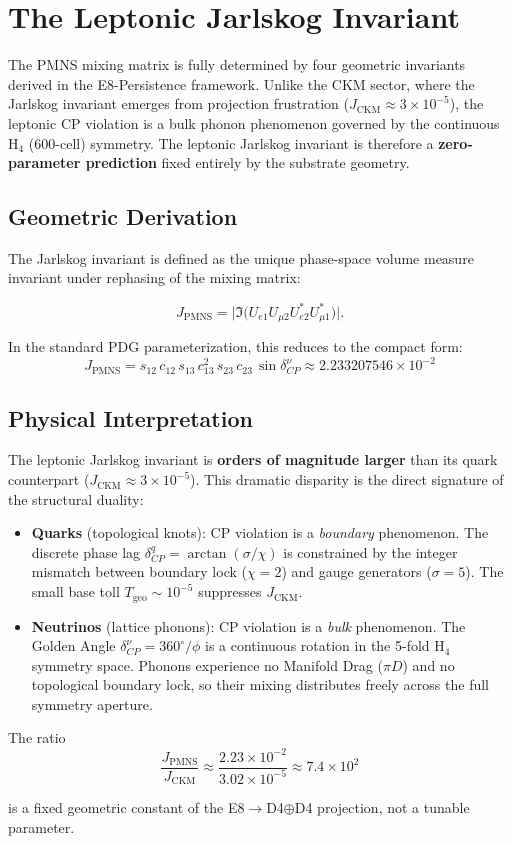 \section{The Leptonic Jarlskog Invariant}

The PMNS mixing matrix is fully determined by four geometric invariants derived in the E8-Persistence framework. Unlike the CKM sector, where the Jarlskog invariant emerges from projection frustration ($J_{\text{CKM}} \approx 3 \times 10^{-5}$),
the leptonic CP violation is a bulk phonon phenomenon governed by the continuous H$_4$ (600-cell) symmetry. The leptonic Jarlskog invariant is therefore a \textbf{zero-parameter prediction} fixed entirely by the substrate geometry.

\subsection{Geometric Derivation}

The Jarlskog invariant is defined as the unique phase-space volume measure invariant under rephasing of the mixing matrix:

\begin{equation}
    J_{\text{PMNS}} = \bigl|\Im\bigl(U_{e1} U_{\mu 2} U_{e2}^{*} U_{\mu 1}^{*}\bigr)\bigr|.
\end{equation}

In the standard PDG parameterization, this reduces to the compact form:
\begin{equation}
    \boxed{
    J_{\text{PMNS}} = s_{12}\,c_{12}\,s_{13}\,c_{13}^{2}\,s_{23}\,c_{23}\,\sin\delta_{CP}^{\nu} \approx 2.233207546 \times 10^{-2}
    }
\end{equation}

\subsection{Physical Interpretation}

The leptonic Jarlskog invariant is \textbf{orders of magnitude larger} than its quark counterpart ($J_{\text{CKM}} \approx 3 \times 10^{-5}$). This dramatic disparity is the direct signature of the structural duality:

\begin{itemize}
    \item \textbf{Quarks} (topological knots): CP violation is a \textit{boundary} phenomenon. The discrete phase lag $\delta_{CP}^{q} = \arctan(\sigma/\chi)$ is constrained by the integer mismatch between boundary lock ($\chi=2$) and
    gauge generators ($\sigma=5$). The small base toll $T_{\text{geo}} \sim 10^{-5}$ suppresses $J_{\text{CKM}}$.

    \item \textbf{Neutrinos} (lattice phonons): CP violation is a \textit{bulk} phenomenon. The Golden Angle $\delta_{CP}^{\nu} = 360^{\circ}/\phi$ is a continuous rotation in the 5-fold H$_4$ symmetry space. Phonons experience no Manifold Drag ($\pi D$) and no topological boundary lock, so their mixing distributes freely across the full symmetry aperture.
\end{itemize}

The ratio
\begin{equation}
    \frac{J_{\text{PMNS}}}{J_{\text{CKM}}} \approx \frac{2.23 \times 10^{-2}}{3.02 \times 10^{-5}}
    \approx 7.4 \times 10^{2}
\end{equation}

is a fixed geometric constant of the E8$\to$D4$\oplus$D4 projection, not a tunable parameter.